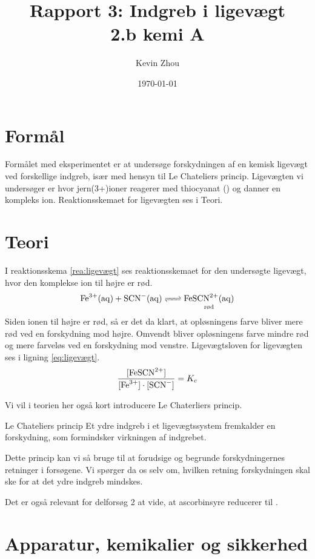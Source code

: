 \documentclass{report}
\title{Rapport 3: Indgreb i ligevægt\\
{\Large \textbf{2.b kemi A}}}
\author{Kevin Zhou}
\date{\today}
\begin{document}
\maketitle
\section*{Formål}
Formålet med eksperimentet er at undersøge forskydningen af en kemisk ligevægt ved forskellige indgreb, især med hensyn til Le Chateliers princip.
Ligevægten vi undersøger er hvor jern(3+)ioner reagerer med thiocyanat () og danner en kompleks ion. 
Reaktionsskemaet for ligevægten ses i Teori.
\section*{Teori}
I reaktionsskema \ref{rea:ligevægt} ses reaktionsskemaet for den undersøgte ligevægt, hvor den komplekse ion til højre er rød.
\begin{equation}
\label{rea:ligevægt}
\begin{split}
  \ce{Fe^3+(aq) + SCN-(aq) <=> $\underset{\text{rød}}{\ce{FeSCN^2+(aq)}}$} 
\end{split}
\end{equation}
Siden ionen til højre er rød, så er det da klart, at opløsningens farve bliver mere rød ved en forskydning mod højre.
Omvendt bliver opløsningens farve mindre rød og mere farveløs ved en forskydning mod venstre.
Ligevægtsloven for ligevægten ses i ligning \ref{eq:ligevægt}.
\begin{equation}
  \label{eq:ligevægt}
\begin{split}
  \frac{[\ce{FeSCN^2+}]}{[\ce{Fe^3+}]\cdot [\ce{SCN-}]}=K_c
\end{split}
\end{equation}

Vi vil i teorien her også kort introducere Le Chaterliers princip.
\begin{Theorem*}{Le Chateliers princip}{}
Et ydre indgreb i et ligevægtssystem fremkalder en forskydning, som formindsker virkningen af indgrebet.
\end{Theorem*}
Dette princip kan vi så bruge til at forudsige og begrunde forskydningernes retninger i forsøgene.
Vi spørger da os selv om, hvilken retning forskydningen skal ske for at det ydre indgreb mindskes.

Det er også relevant for delforsøg 2 at vide, at ascorbinsyre reducerer  til .
\section*{Apparatur, kemikalier og sikkerhed}
\end{document}
